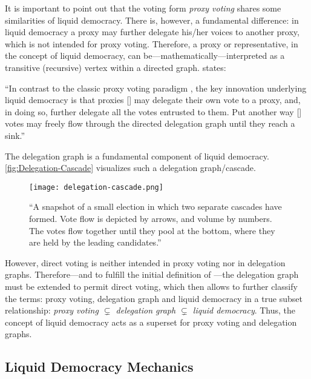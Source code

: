 It is important to point out that the voting form \textit{proxy voting} shares some similarities of liquid democracy. There is, however, a fundamental difference: in liquid democracy a proxy may further delegate his/her voices to another proxy, which is not intended for proxy voting. Therefore, a proxy or representative, in the concept of liquid democracy, can be---mathematically---interpreted as a transitive (recursive) vertex within a directed graph. \citeauthor{Kahng2018} states:

\begin{displayquote}
“In contrast to the classic proxy voting paradigm \parencite{Miller1969}, the key innovation underlying liquid democracy is that proxies [\textellipsis] may delegate their own vote to a proxy, and, in doing so, further delegate all the votes entrusted to them. Put another way [\textellipsis] votes may freely flow through the directed delegation graph until they reach a sink.”\\[1mm]
\hspace*{\fill}\textcite{Kahng2018}
\end{displayquote}

The delegation graph is a fundamental component of liquid democracy. \autoref{fig:Delegation-Cascade} visualizes such a delegation graph/cascade. 

\begin{figure}[H]
\centering
\texttt{[image: delegation-cascade.png]}
	\caption[Delegate cascade voting]{“A snapshot of a small election in which two separate cascades have formed. Vote flow is depicted by arrows, and volume by numbers. The votes flow together until they pool at the bottom, where they are held by the leading candidates.” \parencite{Allen2008}}
	\label{fig:Delegation-Cascade}
\end{figure}
However, direct voting is neither intended in proxy voting nor in delegation graphs. Therefore---and to fulfill the initial definition of ---the delegation graph must be extended to permit direct voting, which then allows to further classify the terms: proxy voting, delegation graph and liquid democracy in a true subset relationship: \textit{proxy voting \(\subsetneq\) delegation graph \(\subsetneq\) liquid democracy}. Thus, the concept of liquid democracy acts as a superset for proxy voting and delegation graphs. 

\subsection{Liquid Democracy Mechanics}
\label{ssec:Liquid_Democracy_Mechanics}

